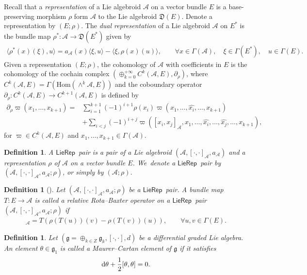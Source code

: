 \documentclass[pdftex]{sigma}%
\numberwithin{equation}{section}
\newtheorem{defi}[thm]{Definition}
\newcommand{\huaA}{\mathcal{A}}
\newcommand{\frkD}{\mathfrak D}
\newcommand{\frkg}{\mathfrak g}
\newcommand{\Hom}{\mathrm{Hom}}
\newcommand{\LP}{$\mathsf{LieRep}$~}
\begin{document}
Recall that a {\it representation} of a Lie algebroid $\huaA$
 on a vector bundle $E$ is a base-preserving morphism $\rho$ form $\huaA$ to the Lie algebroid $\frkD(E)$.
Denote a representation by $(E;\rho).$
The {\it dual representation} of a Lie algebroid $\huaA$ on $E^*$ is the bundle map $\rho^*\colon \huaA\longrightarrow \frkD(E^*)$ given by
\begin{gather*}
\langle \rho^*(x)(\xi),u\rangle=a_\huaA(x)\langle \xi,u\rangle-\langle \xi,\rho(x)(u)\rangle,\qquad \forall x\in \Gamma(\huaA),\quad\xi\in\Gamma(E^*),\quad u\in\Gamma(E).
\end{gather*}
Given a representation $(E;\rho)$, the cohomology of $\huaA$ with coefficients in $E$ is the cohomology of the cochain complex
$(\oplus_{k=0}^{+\infty}C^k(\huaA,E),\partial_\rho )$, where $C^k(\huaA,E)=\Gamma(\Hom(\wedge^k \huaA, E))$ and the coboundary operator $\partial_\rho\colon C^k(\huaA,E)\to C^{k+1}(\huaA,E)$
is defined by
\begin{align*}
 \partial_\rho\varpi(x_1,\dots,x_{k+1}){}=&\sum_{i=1}^{k+1}(-1)^{i+1} \rho(x_i)\varpi(x_1,\dots,\hat{x_i},\dots,x_{k+1})
 \\
 &+\sum_{i<j}(-1)^{i+j}\varpi([x_i,x_j]_\huaA,x_1,\dots,\hat{x_i},\dots,\hat{x_j},\dots,x_{k+1}),
\end{align*}
for $\varpi\in C^k(\huaA,E) $ and $x_1,\dots,x_{k+1}\in \Gamma(\huaA)$.

\begin{defi}
A {\it \LP pair} is a pair of a Lie algebroid $(\huaA,[\cdot,\cdot]_\huaA,a_\huaA)$ and a representation $\rho$ of $\huaA$ on a vector bundle $E$. We~denote a \LP pair by $(\huaA,[\cdot,\cdot]_\huaA,a_\huaA;\rho)$, or simply by $(\huaA;\rho)$.
\end{defi}


\begin{defi}[\cite{LiuShengBaiChen}]
Let $(\huaA,[\cdot,\cdot]_\huaA,a_\huaA;\rho)$ be a \LP pair. A bundle map
 $T\colon E\longrightarrow \huaA$ is called a {\it relative Rota--Baxter operator} on a \LP pair $(\huaA,[\cdot,\cdot]_\huaA,a_\huaA;\rho)$ if
 \begin{gather*}
 [T(u),T(v)]_{\huaA}=T(\rho(T(u))(v)-\rho(T(v))(u)), \qquad\forall u,v\in\Gamma{(E)}.
\end{gather*}
\end{defi}

\begin{defi}
Let $(\frkg=\oplus_{k\in Z} \frkg_{k},[\cdot,\cdot],d)$ be a differential graded Lie algebra. An element $\theta\in \frkg_{1}$ is called a {\it Maurer--Cartan element} of $\frkg$ if it satisfies
\begin{gather*}
{\rm d}\theta+\frac {1}{2}[\theta,\theta]=0.
\end{gather*}
\end{defi}
\end{document}
